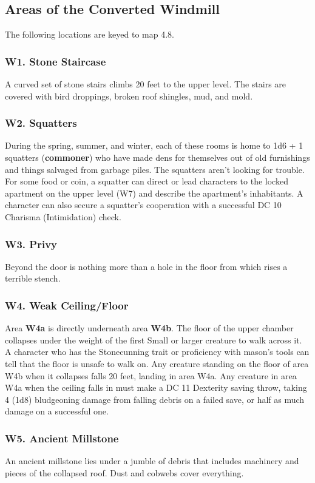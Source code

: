\documentclass[10pt,a4paper,twoside,twocolumn,openany,nodeprecatedcode]{dndbook}
\begin{document}
\subsection{Areas of the Converted Windmill}
The following locations are keyed to map 4.8.
\subsubsection{W1. Stone Staircase}
A curved set of stone stairs climbs 20 feet to the upper level. The stairs are covered with bird droppings, broken roof shingles, mud, and mold.
\subsubsection{W2. Squatters}
During the spring, summer, and winter, each of these rooms is home to 1d6 + 1 squatters (\textbf{commoner}) who have made dens for themselves out of old furnishings and things salvaged from garbage piles. The squatters aren't looking for trouble.
For some food or coin, a squatter can direct or lead characters to the locked apartment on the upper level (W7) and describe the apartment's inhabitants. A character can also secure a squatter's cooperation with a successful DC 10 Charisma (Intimidation) check.
\subsubsection{W3. Privy}
Beyond the door is nothing more than a hole in the floor from which rises a terrible stench.
\subsubsection{W4. Weak Ceiling/Floor}
Area \textbf{W4a} is directly underneath area \textbf{W4b}. The floor of the upper chamber collapses under the weight of the first Small or larger creature to walk across it. A character who has the Stonecunning trait or proficiency with mason's tools can tell that the floor is unsafe to walk on.
Any creature standing on the floor of area W4b when it collapses falls 20 feet, landing in area W4a. Any creature in area W4a when the ceiling falls in must make a DC 11 Dexterity saving throw, taking 4 (1d8) bludgeoning damage from falling debris on a failed save, or half as much damage on a successful one.
\subsubsection{W5. Ancient Millstone}
An ancient millstone lies under a jumble of debris that includes machinery and pieces of the collapsed roof. Dust and cobwebs cover everything.
\end{document}
